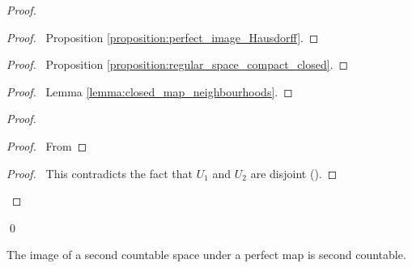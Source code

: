 \begin{proof}
    \pf
    \begin{proof}
        \pf\ Proposition \ref{proposition:perfect_image_Hausdorff}.
    \end{proof}
    \begin{proof}
        \pf\ Proposition \ref{proposition:regular_space_compact_closed}.
    \end{proof}
    \begin{proof}
        \pf\ Lemma \ref{lemma:closed_map_neighbourhoods}.
    \end{proof}
    \begin{proof}
        \begin{proof}
            \pf\ From 
        \end{proof}
        \qedstep
        \begin{proof}
            \pf\ This contradicts the fact that $U_1$ and $U_2$ are disjoint
            ().
        \end{proof}
    \end{proof}
    \qed
\end{proof}

\begin{proposition}
    \label{proposition:perfect_image_second_countable}
    The image of a second countable space under a perfect map is second countable.
\end{proposition}

